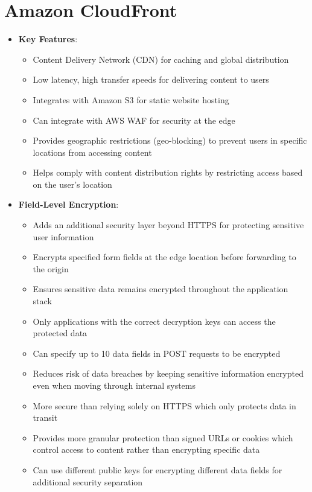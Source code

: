 \documentclass[11pt,a4paper]{report}
\begin{document}
\section{Amazon CloudFront}

\begin{itemize}
  \item \textbf{Key Features}:
\begin{itemize}
  \item Content Delivery Network (CDN) for caching and global distribution
  \item Low latency, high transfer speeds for delivering content to users
  \item Integrates with Amazon S3 for static website hosting
  \item Can integrate with AWS WAF for security at the edge
  \item Provides geographic restrictions (geo-blocking) to prevent users in specific locations from accessing content
  \item Helps comply with content distribution rights by restricting access based on the user's location
\end{itemize}
  \item \textbf{Field-Level Encryption}:
\begin{itemize}
  \item Adds an additional security layer beyond HTTPS for protecting sensitive user information
  \item Encrypts specified form fields at the edge location before forwarding to the origin
  \item Ensures sensitive data remains encrypted throughout the application stack
  \item Only applications with the correct decryption keys can access the protected data
  \item Can specify up to 10 data fields in POST requests to be encrypted
  \item Reduces risk of data breaches by keeping sensitive information encrypted even when moving through internal systems
  \item More secure than relying solely on HTTPS which only protects data in transit
  \item Provides more granular protection than signed URLs or cookies which control access to content rather than encrypting specific data
  \item Can use different public keys for encrypting different data fields for additional security separation
\end{itemize}

\end{itemize}
\end{document}
